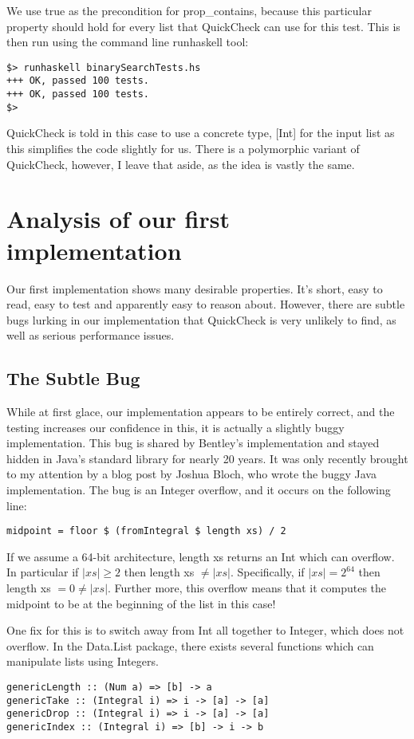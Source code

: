 \documentclass{article}
\begin{document}
We use true as the precondition for prop\_contains, because this particular property should hold for every list that QuickCheck can use for this test. This is then run using the command line runhaskell tool: 

\lstset{language=sh}

\begin{lstlisting}
$> runhaskell binarySearchTests.hs
+++ OK, passed 100 tests.
+++ OK, passed 100 tests.
$>
\end{lstlisting}

\lstset{language=Haskell}

QuickCheck is told in this case to use a concrete type, [Int] for the input list as this simplifies the code slightly for us. There is a polymorphic variant of QuickCheck, however, I leave that aside, as the idea is vastly the same.
 
\section{Analysis of our first implementation}

Our first implementation shows many desirable properties. It's short, easy to read, easy to test and apparently easy to reason about. However, there are subtle bugs lurking in our implementation that QuickCheck is very unlikely to find, as well as serious performance issues.

\subsection{The Subtle Bug}

While at first glace, our implementation appears to be entirely correct, and the testing increases our confidence in this, it is actually a slightly buggy implementation. This bug is shared by Bentley's implementation and stayed hidden in Java's standard library for nearly 20 years. It was only recently brought to my attention by a blog post\cite{JBloch2006} by Joshua Bloch, who wrote the buggy Java implementation. The bug is an Integer overflow, and it occurs on the following line:

\begin{lstlisting}
midpoint = floor $ (fromIntegral $ length xs) / 2
\end{lstlisting}

If we assume a 64-bit architecture, length xs returns an Int which can overflow. In particular if $|xs| \geq 2$ then length xs $ \neq |xs|$. Specifically, if $|xs| = 2^64$ then length xs $= 0 \neq |xs|$. Further more, this overflow means that it computes the midpoint to be at the beginning of the list in this case!

One fix for this is to switch away from Int all together to Integer, which does not overflow. In the Data.List package, there exists several functions which can manipulate lists using Integers.

\begin{lstlisting}
genericLength :: (Num a) => [b] -> a
genericTake :: (Integral i) => i -> [a] -> [a]
genericDrop :: (Integral i) => i -> [a] -> [a]
genericIndex :: (Integral i) => [b] -> i -> b
\end{lstlisting} 
\end{document}
